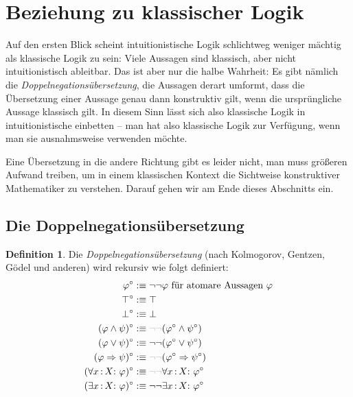 \documentclass[a4paper,ngerman,12pt]{scrartcl}
\theoremstyle{definition}
\newtheorem{defn}{Definition}[section]
\theoremstyle{plain}
\theoremstyle{remark}
\renewcommand{\_}{\mathpunct{.}\,}
\newcommand{\?}{\,{:}\,}
\begin{document}
\section{Beziehung zu klassischer Logik}
\label{bez-klassische-logik}

Auf den ersten Blick scheint intuitionistische Logik schlichtweg weniger
mächtig als klassische Logik zu sein: Viele Aussagen sind klassisch, aber nicht
intuitionistisch ableitbar. Das ist aber nur die halbe
Wahrheit: Es gibt nämlich die \emph{Doppel\-ne\-ga\-tions\-über\-set\-zung},
die Aussagen derart umformt, dass die
Übersetzung einer Aussage genau dann konstruktiv gilt, wenn die ursprüngliche Aussage
klassisch gilt. In diesem Sinn lässt sich also klassische Logik in
intuitionistische einbetten -- man hat also klassische Logik zur Verfügung,
wenn man sie ausnahmsweise verwenden möchte.

Eine Übersetzung in die andere Richtung gibt es leider nicht, man muss größeren
Aufwand treiben, um in einem klassischen Kontext die Sichtweise konstruktiver
Mathematiker zu verstehen. Darauf gehen wir am Ende dieses Abschnitts ein.


\subsection{Die Doppelnegationsübersetzung}

\begin{defn}Die \emph{Doppelnegationsübersetzung} (nach Kolmogorov, Gentzen,
Gödel und anderen) wird rekursiv wie folgt definiert:
\newcommand{\optnegneg}{\textcolor{grey}{\neg\neg}}
\begin{align*}
  \varphi^\circ &:\equiv \neg\neg \varphi \text{ für atomare Aussagen~$\varphi$} \\
  \top^\circ &:\equiv \top \\
  \bot^\circ &:\equiv \bot \\
  (\varphi \wedge \psi)^\circ &:\equiv \optnegneg(\varphi^\circ \wedge \psi^\circ) \\
  (\varphi \vee \psi)^\circ &:\equiv \neg\neg(\varphi^\circ \vee \psi^\circ) \\
  (\varphi \Rightarrow \psi)^\circ &:\equiv \optnegneg(\varphi^\circ \Rightarrow \psi^\circ) \\
  (\forall x\?X{:}\ \varphi)^\circ &:\equiv \optnegneg\forall x\?X{:}\ \varphi^\circ \\
  (\exists x\?X{:}\ \varphi)^\circ &:\equiv \neg\neg\exists x\?X{:}\ \varphi^\circ
\end{align*}
\end{defn}
\end{document}
